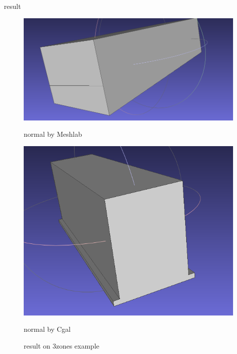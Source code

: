 \documentclass[10pt]{beamer}
\begin{document}
\begin{frame}{result}
    \begin{figure}[H]
        \centering
        \begin{minipage}[t]{0.52\textwidth}
          \includegraphics[width=\textwidth]{../../images/screen_kinetic/3zones_result_normal5_cgal.png}
          \caption*{normal by Meshlab}
        \end{minipage}
        \begin{minipage}[t]{0.45\textwidth}
            \includegraphics[width=\textwidth]{../../images/screen_kinetic/3zones_result_normal_cgal.png}
            \caption*{normal by Cgal}
          \end{minipage}
        \caption{result on 3zones example}
      \end{figure}  
\end{frame}
\end{document}
